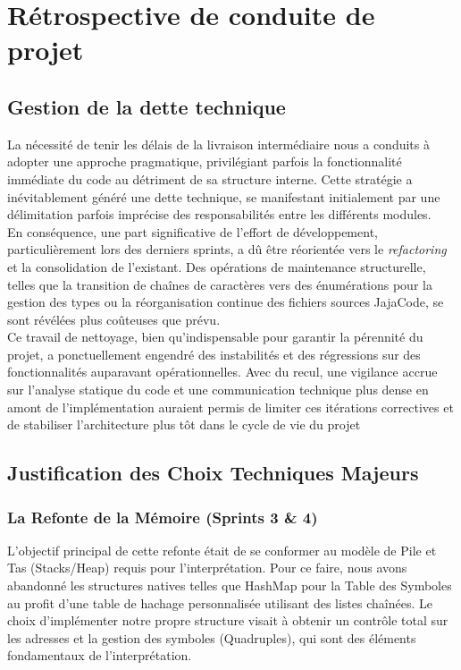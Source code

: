 \section{Rétrospective de conduite de projet}

\subsection{Gestion de la dette technique}

La nécessité de tenir les délais de la livraison intermédiaire nous a conduits à adopter une approche pragmatique, privilégiant parfois la fonctionnalité immédiate du code au détriment de sa structure interne. Cette stratégie a inévitablement généré une dette technique, se manifestant initialement par une délimitation parfois imprécise des responsabilités entre les différents modules.\\

En conséquence, une part significative de l'effort de développement, particulièrement lors des derniers sprints, a dû être réorientée vers le \textit{refactoring} et la consolidation de l'existant. Des opérations de maintenance structurelle, telles que la transition de chaînes de caractères vers des énumérations pour la gestion des types ou la réorganisation continue des fichiers sources JajaCode, se sont révélées plus coûteuses que prévu.\\

Ce travail de nettoyage, bien qu'indispensable pour garantir la pérennité du projet, a ponctuellement engendré des instabilités et des régressions sur des fonctionnalités auparavant opérationnelles. Avec du recul, une vigilance accrue sur l'analyse statique du code et une communication technique plus dense en amont de l'implémentation auraient permis de limiter ces itérations correctives et de stabiliser l'architecture plus tôt dans le cycle de vie du projet

\subsection{Justification des Choix Techniques Majeurs}

\subsubsection{La Refonte de la Mémoire (Sprints 3 \& 4)}

L'objectif principal de cette refonte était de se conformer au modèle de Pile et Tas (Stacks/Heap) requis pour l'interprétation. Pour ce faire, nous avons abandonné les structures natives telles que HashMap pour la Table des Symboles au profit d'une table de hachage personnalisée utilisant des listes chaînées. Le choix d'implémenter notre propre structure visait à obtenir un contrôle total sur les adresses et la gestion des symboles (Quadruples), qui sont des éléments fondamentaux de l'interprétation.

